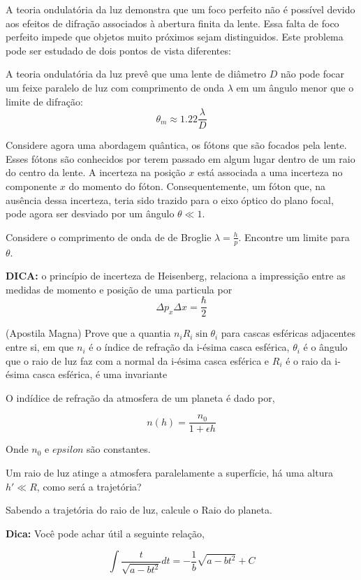 \documentclass[11pt]{article}
\begin{document}
\begin{pproblem}
    A teoria ondulatória da luz demonstra que um foco perfeito não é possível devido aos efeitos de difração associados à abertura finita da lente. Essa falta de foco perfeito impede que objetos muito próximos sejam distinguidos. Este problema pode ser estudado de dois pontos de vista diferentes:

    A teoria ondulatória da luz prevê que uma lente de diâmetro $D$ não pode focar um feixe paralelo de luz com comprimento de onda $\lambda$ em um ângulo menor que o limite de difração:
    \begin{equation}
        \theta_m \approx 1.22 \frac{\lambda}{D}
    \end{equation}

    Considere agora uma abordagem quântica, os fótons que são focados pela lente. Esses fótons são conhecidos por terem passado em algum lugar dentro de um raio do centro da lente. A incerteza na posição $x$ está associada a uma incerteza no componente $x$ do momento do fóton. Consequentemente, um fóton que, na ausência dessa incerteza, teria sido trazido para o eixo óptico do plano focal, pode agora ser desviado por um ângulo $\theta \ll 1$.

    Considere o comprimento de onda de de Broglie $\lambda = \frac{h}{p}$. Encontre um limite para $\theta$.

    \textbf{DICA:} o princípio de incerteza de Heisenberg, relaciona a impressição entre as medidas de momento e posição de uma particula por 
    \[\Delta p_x \Delta x = \frac{\hbar}{2}\]


\end{pproblem}

\begin{pproblem} (Apostila Magna)
    Prove que a quantia \(n_iR_i\sin \theta_i\) para cascas esféricas adjacentes entre si, em que \(n_i\) é o índice de refração da i-ésima casca esférica, \(\theta_i\) é o ângulo que o raio de luz faz com a normal da i-ésima casca esférica e \(R_i\) é o raio da i-ésima casca esférica, é uma invariante
    
\end{pproblem}

\begin{pproblem}
    O indídice de refração da atmosfera de um planeta é dado por, 

    \[n(h) = \frac{n_0}{1+\epsilon h}\]

    Onde \(n_0\) e \(epsilon\) são constantes.

    \begin{alternativas}
        \item Um raio de luz atinge a atmosfera paralelamente a superfície, há uma altura \(h'\ll R\), como será a trajetória?
        \item Sabendo a trajetória do raio de luz, calcule o Raio do planeta.
    
        \textbf{Dica:} Você pode achar útil a seguinte relação, 

        \[\int \frac{t}{\sqrt{a-bt^2}}dt = -\frac{1}{b}\sqrt{a-bt^2}+C\]
    \end{alternativas}

\end{pproblem}
\end{document}

